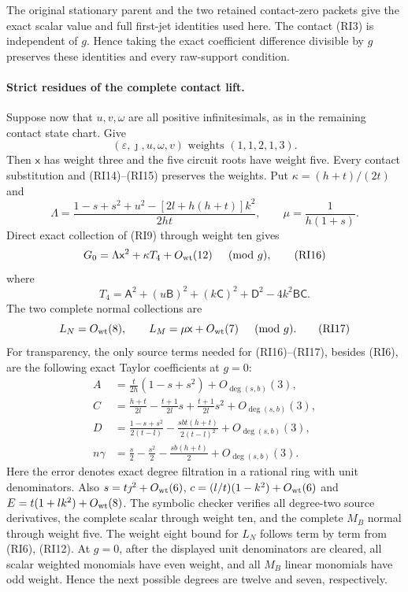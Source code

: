 The original stationary parent and the two retained contact-zero
packets give the exact scalar value and full first-jet identities
used here. The contact (RI3) is independent of $g$. Hence taking
the exact coefficient difference divisible by $g$ preserves these
identities and every raw-support condition.

\paragraph{Strict residues of the complete contact lift.}
Suppose now that $u,v,\omega$ are all positive infinitesimals, as
in the remaining contact state chart. Give
\[
 (\varepsilon,\jmath,u,\omega,v)
       \text{ weights }(1,1,2,1,3).
\]
Then $\mathsf x$ has weight three and the five circuit roots have
weight five. Every contact substitution and (RI14)--(RI15) preserves
the weights. Put $\kappa=(h+t)/(2t)$ and
\[
 \Lambda=\frac{1-s+s^2+u^2-[2l+h(h+t)]k^2}{2ht},\qquad
 \mu=\frac1{h(1+s)}.
\]
Direct exact collection of (RI9) through weight ten gives
\[
 G_0=\Lambda\mathsf x^2+\kappa T_4+O_{\rm wt}(12)
                   \quad\pmod g,                 \tag{RI16}
\]
where
\[
 T_4=\mathsf A^2+(u\mathsf B)^2+(k\mathsf C)^2+
          \mathsf D^2-4k^2\mathsf B\mathsf C.
\]
The two complete normal collections are
\[
 L_N=O_{\rm wt}(8),\qquad
 L_M=\mu\mathsf x+O_{\rm wt}(7)\quad\pmod g.
 \tag{RI17}
\]
For transparency, the only source terms needed for (RI16)--(RI17),
besides (RI6), are the following exact Taylor coefficients at $g=0$:
\[
\begin{aligned}
 A&=\frac t{2h}(1-s+s^2)+O_{\deg(s,b)}(3),\\
 C&=\frac{h+t}{2l}-\frac{t+1}{2l}s+
                      \frac{t+1}{2l}s^2+O_{\deg(s,b)}(3),\\
 D&=\frac{1-s+s^2}{2(t-l)}-
        \frac{sbt(h+t)}{2(t-l)^2}+O_{\deg(s,b)}(3),\\
 n\gamma&=\frac s2-\frac{s^2}2-\frac{sb(h+t)}2+
                         O_{\deg(s,b)}(3).
\end{aligned}                                                       \tag{RI18}
\]
Here the error denotes exact degree filtration in a rational ring
with unit denominators. Also $s=t\jmath^2+O_{\rm wt}(6)$,
$c=(l/t)(1-k^2)+O_{\rm wt}(6)$ and
$E=t(1+lk^2)+O_{\rm wt}(8)$. The symbolic checker verifies all
degree-two source derivatives, the complete scalar through weight
ten, and the complete $M_B$ normal through weight five. The weight
eight bound for $L_N$ follows term by term from (RI6), (RI12).
At $g=0$, after the displayed unit denominators are cleared, all
scalar weighted monomials have even weight, and all $M_B$ linear
monomials have odd weight. Hence the next possible degrees are
twelve and seven, respectively.

